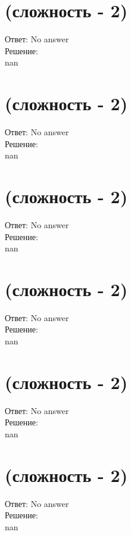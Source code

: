 \documentclass{article}%
\begin{document}
%
\section{(сложность {-} 2)}%
\label{sec:( {-} 2)}%
\hspace{3ex} Ответ: No answer \\%
%
\hspace*{3ex} Решение: \\%
nan

%
\section{(сложность {-} 2)}%
\label{sec:( {-} 2)}%
\hspace{3ex} Ответ: No answer \\%
%
\hspace*{3ex} Решение: \\%
nan

%
\section{(сложность {-} 2)}%
\label{sec:( {-} 2)}%
\hspace{3ex} Ответ: No answer \\%
%
\hspace*{3ex} Решение: \\%
nan

%
\section{(сложность {-} 2)}%
\label{sec:( {-} 2)}%
\hspace{3ex} Ответ: No answer \\%
%
\hspace*{3ex} Решение: \\%
nan

%
\section{(сложность {-} 2)}%
\label{sec:( {-} 2)}%
\hspace{3ex} Ответ: No answer \\%
%
\hspace*{3ex} Решение: \\%
nan

%
\section{(сложность {-} 2)}%
\label{sec:( {-} 2)}%
\hspace{3ex} Ответ: No answer \\%
%
\hspace*{3ex} Решение: \\%
nan
\end{document}
